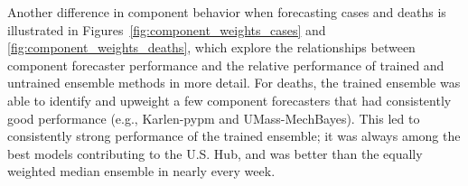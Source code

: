 \documentclass[11pt,3p,authoryear]{elsarticle}
\begin{document}
Another difference in component behavior when forecasting cases and deaths is illustrated in Figures~\ref{fig:component_weights_cases} and \ref{fig:component_weights_deaths}, which explore the relationships between component forecaster performance and the relative performance of trained and untrained ensemble methods in more detail.
For deaths, the trained ensemble was able to identify and upweight a few component forecasters that had consistently good performance (e.g., Karlen-pypm and UMass-MechBayes).
This led to consistently strong performance of the trained ensemble; it was always among the best models contributing to the U.S. Hub, and was better than the equally weighted median ensemble in nearly every week.
\end{document}
